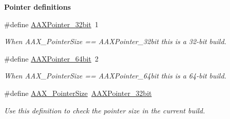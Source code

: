\begin{Indent}\textbf{ Pointer definitions}\par
\begin{DoxyCompactItemize}
\item 
\#define \mbox{\hyperlink{a00392_a3310096b753437bda7ec67de445cf9cb}{A\+A\+X\+Pointer\+\_\+32bit}}~1
\begin{DoxyCompactList}\small\item\em When A\+A\+X\+\_\+\+Pointer\+Size == A\+A\+X\+Pointer\+\_\+32bit this is a 32-\/bit build. \end{DoxyCompactList}\item 
\#define \mbox{\hyperlink{a00392_a1a53e919284726babb582d3bb105b08b}{A\+A\+X\+Pointer\+\_\+64bit}}~2
\begin{DoxyCompactList}\small\item\em When A\+A\+X\+\_\+\+Pointer\+Size == A\+A\+X\+Pointer\+\_\+64bit this is a 64-\/bit build. \end{DoxyCompactList}\item 
\#define \mbox{\hyperlink{a00392_a078a28903a34f1bd25f1e23d65df6212}{A\+A\+X\+\_\+\+Pointer\+Size}}~\mbox{\hyperlink{a00392_a3310096b753437bda7ec67de445cf9cb}{A\+A\+X\+Pointer\+\_\+32bit}}
\begin{DoxyCompactList}\small\item\em Use this definition to check the pointer size in the current build. \end{DoxyCompactList}\end{DoxyCompactItemize}
\end{Indent}

